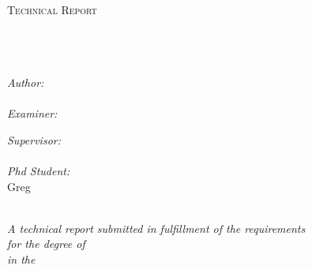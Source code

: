 \documentclass[
11pt, %
english, %
singlespacing, %
headsepline, %
]{MastersDoctoralThesis} %
\author{Adam Kidd} %
\begin{document}
\frontmatter %

\pagestyle{plain} %


\begin{titlepage}
\begin{center}

\textsc{\LARGE \univname}\\[1.5cm] %
\textsc{\Large Technical Report}\\[0.5cm] %

\HRule \\[0.4cm] %
{\huge \bfseries \ttitle}\\[0.4cm] %
\HRule \\[1.5cm] %
 
\begin{minipage}{0.4\textwidth}
\begin{flushleft} \large
\emph{Author:}\\
\href{http://www.johnsmith.com}{\authorname} \\ %
\emph{Examiner:}\\
\examname
\end{flushleft}
\end{minipage}
\begin{minipage}{0.4\textwidth}
\begin{flushright} \large
\emph{Supervisor:} \\
\href{http://www.jamessmith.com}{\supname}\\ %
\emph{Phd Student:}\\
Greg 
\end{flushright}
\end{minipage}\\[3cm]
 
\large \textit{A technical report submitted in fulfillment of the requirements\\ for the degree of \degreename}\\[0.3cm] %
\textit{in the}\\[0.4cm]
\deptname\\[1cm] %




\end{center}
\end{titlepage}
\end{document}

